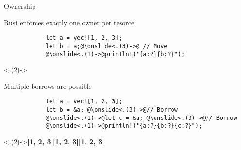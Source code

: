 \begin{multiframe}[fragile]{Ownership}
	\begin{subframe}
		Rust enforces \alert{exactly one} owner per resorce\\[1em]%
		\pause%

		\begin{verbatim}
            let a = vec![1, 2, 3];
            let b = a;@\onslide<.(3)->@ // Move
            @\onslide<.(1)->@println!("{a:?}{b:?}");
        \end{verbatim}
		\onslide<.(2)->\\[1em]%
		\addtocounter{beamerpauses}{2}%
	\end{subframe}

	\begin{subframe}
		Multiple \alert{borrows} are possible\\[1em]%
		\pause%

		\begin{verbatim}
            let a = vec![1, 2, 3];
            let b = &a; @\onslide<.(3)->@// Borrow
            @\onslide<.(1)->@let c = &a; @\onslide<.(3)->@// Borrow
            @\onslide<.(1)->@println!("{a:?}{b:?}{c:?}");
        \end{verbatim}
		\onslide<.(2)->{\footnotesize\ttfamily\bfseries[1, 2, 3][1, 2, 3][1, 2, 3]}\\%
		\addtocounter{beamerpauses}{2}%
	\end{subframe}
\end{multiframe}

